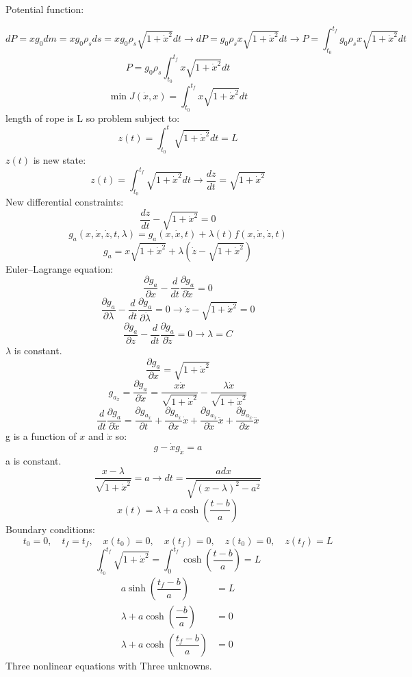Potential function:


$$dP = xg_0dm = xg_0\rho_s ds = xg_0\rho_s\sqrt{1+\dot{x}^2}dt
\to dP = g_0\rho_sx\sqrt{1+\dot{x}^2} dt\to P = \int_{t_0}^{t_f} g_0\rho_sx\sqrt{1+\dot{x}^2}dt
$$
$$P = g_0\rho_s\int_{t_0}^{t_f} x\sqrt{1+\dot{x}^2}dt$$
$$\min J(\dot{x}, x) = \int_{t_0}^{t_f} x\sqrt{1+\dot{x}^2}dt$$
length of rope is L so problem subject to:
$$z(t) = \int_{t_0}^{t} \sqrt{1+\dot{x}^2}dt = L$$ 
$z(t)$ is new state:
$$z(t) = \int_{t_0}^{t_f} \sqrt{1+\dot{x}^2}dt\to \dfrac{dz}{dt} =\sqrt{1+\dot{x}^2} $$
New differential constraints:
$$\dfrac{dz}{dt} - \sqrt{1+\dot{x}^2}  = 0$$
$$g_a(x, \dot x, \dot z, t, \lambda) = g_a(x, \dot x, t) + \lambda(t)f(x, \dot x, \dot z, t) $$
$$g_a = x\sqrt{1+\dot{x}^2} + \lambda (\dot z - \sqrt{1+\dot{x}^2})$$
Euler–Lagrange equation:
$$\dfrac{\partial g_a}{\partial x} - \dfrac{d}{dt}\dfrac{\partial g_a}{\partial \dot x} = 0$$
$$\dfrac{\partial g_a}{\partial \lambda} - \dfrac{d}{dt}\dfrac{\partial g_a}{\partial \dot \lambda} = 0 \to 
\dot z -  \sqrt{1+\dot{x}^2} = 0
$$
$$\dfrac{\partial g_a}{\partial z} - \dfrac{d}{dt}\dfrac{\partial g_a}{\partial \dot z} = 0 \to \lambda = C$$
$\lambda$ is constant.
$$\dfrac{\partial g_a}{\partial x} =  \sqrt{1+\dot{x}^2}$$
$$g_{a_{\dot{x}}} = \dfrac{\partial g_a}{\partial \dot x} = \dfrac{x\dot x}{\sqrt{1+\dot x^2}}  - \dfrac{\lambda \dot x}{\sqrt{1+\dot x^2}} $$
$$\dfrac{d}{dt}\dfrac{\partial g_a}{\partial \dot x} = \dfrac{\partial g_{a_{\dot{x}}}}{\partial  t}+
\dfrac{\partial g_{a_{\dot{x}}}}{\partial  x}\dot x+
\dfrac{\partial g_{a_{\dot{x}}}}{\partial \dot x}\ddot x+
\dfrac{\partial g_{a_{\dot{x}}}}{\partial \ddot x} \dddot x
$$
g is a function of $x$ and $\dot x$ so:
$$g - \dot x g_{\dot x} = a$$
a is constant.
$$\dfrac{x-\lambda}{\sqrt{1+\dot x^2}} = a \to dt = \dfrac{adx}{\sqrt{(x-\lambda)^2-a^2}}$$
$$x(t) = \lambda + a\cosh(\dfrac{t-b}{a})$$
Boundary conditions:
$$t_0 = 0,\quad t_f =t_f,\quad x(t_0) = 0,\quad x(t_f) = 0,\quad z(t_0) = 0,\quad z(t_f) = L$$
$$\int_{t_0}^{t_f} \sqrt{1 + \dot x^2} =\int_{0}^{t_f}  \cosh(\dfrac{t-b}{a}) = L$$
\begin{align}
a \sinh(\dfrac{t_f-b}{a}) &= L\\
\lambda + a\cosh(\dfrac{-b}{a} )  & = 0\\
\lambda + a\cosh(\dfrac{t_f- b}{a} )  & = 0
\end{align}
Three nonlinear equations with Three unknowns.


